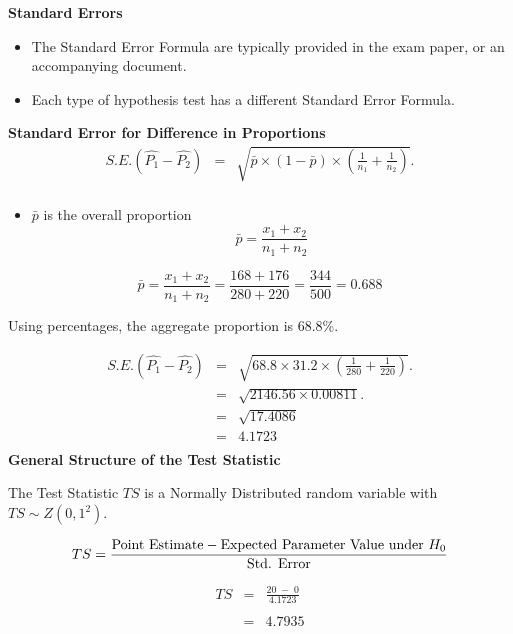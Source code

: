 \documentclass[a4paper,12pt]{article}
\begin{document}
\noindent \textbf{Standard Errors}
\begin{itemize}
\item The Standard Error Formula are typically provided in the exam paper, or an accompanying document.
\item Each type of hypothesis test has a different Standard Error Formula.
\end{itemize}
\bigskip
\begin{framed}
\noindent \textbf{Standard Error for Difference in Proportions}\\
\begin{eqnarray*}
S.E.(\hat{P_1}-\hat{P_2})&=&\sqrt{ \bar{p}\times(1-\bar{p}) \times \left(\frac{1}{n_1}+\frac{1}{n_2}\right)}.\\
\end{eqnarray*}
\begin{itemize}
\item $\bar{p}$ is the overall proportion
\[\bar{p} = \frac{x_1 + x_2}{n_1+n_2}\]
\end{itemize}
\end{framed}

\[\bar{p} = \frac{x_1 + x_2}{n_1+n_2} = \frac{168 + 176}{280+ 220} = \frac{344}{500} =0.688\]

\noindent Using percentages, the aggregate proportion is 68.8\%.

\begin{eqnarray*}
S.E.(\hat{P_1}-\hat{P_2})&=&\sqrt{ 68.8 \times 31.2 \times \left(\frac{1}{280}+\frac{1}{220}\right)}.\\
&=&\sqrt{ 2146.56 \times 0.00811}.\\
&=&\sqrt{17.4086}\\
&=& 4.1723 \\
\end{eqnarray*}
\noindent \textbf{General Structure of the Test Statistic}

\noindent The Test Statistic $TS$ is a Normally  Distributed random variable with $TS \sim Z(0,1^2)$.
\begin{framed}
\[ TS = {\mbox{Point Estimate} - \mbox{Expected Parameter Value under $H_{0}$} \over \mbox{Std. Error}}\]
\end{framed}


\begin{eqnarray*}
TS &=& \frac{ 20\;-\; 0}{4.1723} \\
& & \\
&=& 4.7935\\
\end{eqnarray*}
\newpage 
\end{document}
